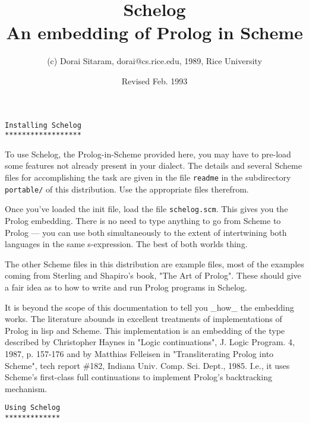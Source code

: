 \setcounter{secnumdepth}{6}
\setcounter{tocdepth}{6}
\topsep=0.1cm
\parsep=0.1cm
\itemsep=0.0cm

\title{
Schelog\\
An embedding of Prolog in Scheme
}
\author{
(c) Dorai Sitaram, dorai@cs.rice.edu, 1989, Rice University
}
\date{Revised Feb. 1993
}
\maketitle

\medskip
{\baselineskip=10pt
\begin{verbatim}
Installing Schelog
******************
\end{verbatim}}
\medskip
\par
To use Schelog, the Prolog-in-Scheme provided here, you
may have to pre-load some features not already present
in your dialect.  The details and several Scheme files
for accomplishing the task are given in the file \verb+readme+
in the subdirectory \verb+portable/+ of this distribution.
Use the appropriate files therefrom.
\medskip
\par
Once you've loaded the init file, load the file
\verb+schelog.scm+.  This gives you the Prolog embedding.
There is no need to type anything to go from Scheme to
Prolog --- you can use both simultaneously to the extent
of intertwining both languages in the same
s-expression.  The best of both worlds thing.
\medskip
\par
The other Scheme files in this distribution are example
files, most of the examples coming from Sterling and
Shapiro's book, "The Art of Prolog".  These should give a
fair idea as to how to write and run Prolog programs in
Schelog.
\medskip
\par
It is beyond the scope of this documentation to tell you
\_how\_ the embedding works.  The literature abounds in
excellent treatments of implementations of Prolog in lisp
and Scheme.  This implementation is an embedding of the type
described by Christopher Haynes in "Logic continuations", J.
Logic Program. 4, 1987, p. 157-176 and by Matthias Felleisen
in "Transliterating Prolog into Scheme", tech report \#182,
Indiana Univ. Comp. Sci. Dept., 1985.  I.e., it uses
Scheme's first-class full continuations to implement
Prolog's backtracking mechanism.
\medskip
\newpage
{\baselineskip=10pt
\begin{verbatim}
Using Schelog
*************
\end{verbatim}}
\medskip
\par
